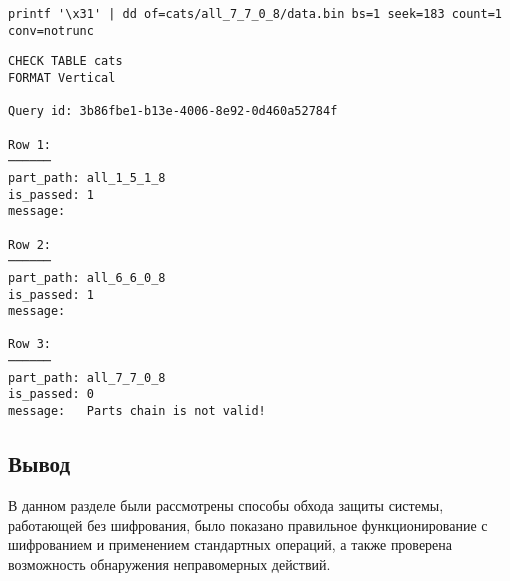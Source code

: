 \begin{lstlisting}[label=code:dd, caption={Неправомерное изменение данных.}]
printf '\x31' | dd of=cats/all_7_7_0_8/data.bin bs=1 seek=183 count=1 conv=notrunc
\end{lstlisting}

\pagebreak

\begin{lstlisting}[label=code:checkattack, caption={Результат проверки после неправомерного изменения данных.}]
CHECK TABLE cats
FORMAT Vertical

Query id: 3b86fbe1-b13e-4006-8e92-0d460a52784f

Row 1:
──────
part_path: all_1_5_1_8
is_passed: 1
message:

Row 2:
──────
part_path: all_6_6_0_8
is_passed: 1
message:

Row 3:
──────
part_path: all_7_7_0_8
is_passed: 0
message:   Parts chain is not valid!
\end{lstlisting}

\subsection*{Вывод}

В данном разделе были рассмотрены способы обхода защиты системы, работающей без шифрования, было показано правильное функционирование с шифрованием и применением стандартных операций, а также проверена возможность обнаружения неправомерных действий.

\pagebreak